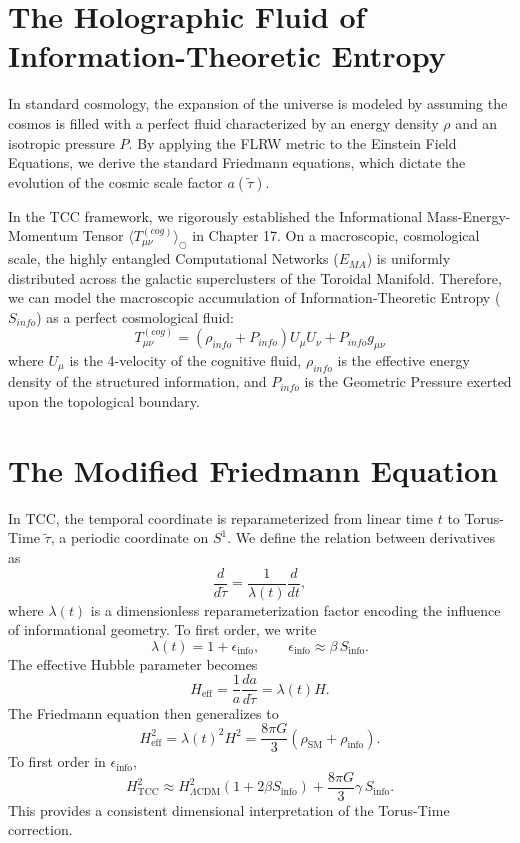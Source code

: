 \documentclass[12pt,openany]{book}
\newcommand{\Sinfo}{S_{\text{info}}}
\theoremstyle{plain}
\theoremstyle{definition}
\theoremstyle{remark}
\begin{document}
\section{The Holographic Fluid of Information-Theoretic Entropy}

In standard cosmology, the expansion of the universe is modeled by assuming the cosmos is filled with a perfect fluid characterized by an energy density $\rho$ and an isotropic pressure $P$. By applying the FLRW metric to the Einstein Field Equations, we derive the standard Friedmann equations, which dictate the evolution of the cosmic scale factor $a(\tilde{\tau})$.

In the TCC framework, we rigorously established the Informational Mass-Energy-Momentum Tensor $\langle T_{\mu\nu}^{(cog)} \rangle_{\bigcirc}$ in Chapter 17. On a macroscopic, cosmological scale, the highly entangled Computational Networks ($E_{MA}$) is uniformly distributed across the galactic superclusters of the Toroidal Manifold. Therefore, we can model the macroscopic accumulation of Information-Theoretic Entropy ($S_{info}$) as a perfect cosmological fluid:
\begin{equation}
T_{\mu\nu}^{(cog)} = (\rho_{info} + P_{info})U_\mu U_\nu + P_{info} g_{\mu\nu}
\end{equation}
where $U_\mu$ is the 4-velocity of the cognitive fluid, $\rho_{info}$ is the effective energy density of the structured information, and $P_{info}$ is the Geometric Pressure exerted upon the topological boundary.

\section{The Modified Friedmann Equation}

In TCC, the temporal coordinate is reparameterized from linear time $t$ to 
Torus-Time $\tilde{\tau}$, a periodic coordinate on $S^1$. We define the 
relation between derivatives as
\[
\frac{d}{d\tilde{\tau}} = \frac{1}{\lambda(t)} \frac{d}{dt},
\]
where $\lambda(t)$ is a dimensionless reparameterization factor encoding 
the influence of informational geometry. To first order, we write
\[
\lambda(t) = 1 + \epsilon_{\text{info}},
\qquad
\epsilon_{\text{info}} \approx \beta \, \Sinfo.
\]
The effective Hubble parameter becomes
\[
H_{\text{eff}} = \frac{1}{a} \frac{da}{d\tilde{\tau}}
= \lambda(t) H.
\]
The Friedmann equation then generalizes to
\[
H_{\text{eff}}^2
= \lambda(t)^2 H^2
= \frac{8\pi G}{3} 
\left( \rho_{\text{SM}} + \rho_{\text{info}} \right).
\]
To first order in $\epsilon_{\text{info}}$,
\[
H_{\text{TCC}}^2 
\approx 
H_{\Lambda\text{CDM}}^2 
\left( 1 + 2\beta \Sinfo \right)
+ \frac{8\pi G}{3} \gamma \, \Sinfo.
\]
This provides a consistent dimensional interpretation of the 
Torus-Time correction.
\end{document}
